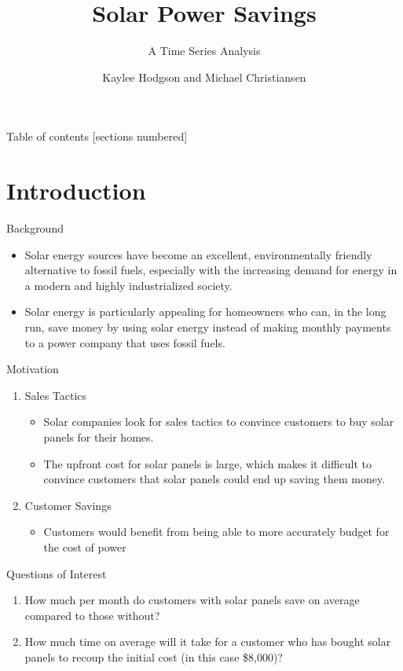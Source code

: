 \documentclass[10pt]{beamer}
\title{Solar Power Savings}
\subtitle{A Time Series Analysis}
\date{}
\author{Kaylee Hodgson and Michael Christiansen}
\institute{Brigham Young University}
\begin{document}
\maketitle

\begin{frame}{Table of contents}
  [sections numbered]
  \tableofcontents[hideallsubsections]
\end{frame}

\section{Introduction}

\begin{frame}[fragile]{Background}
\begin{itemize}
\item Solar energy sources have become an excellent, environmentally friendly alternative to fossil fuels, especially with the increasing demand for energy in a modern and highly industrialized society.
\item Solar energy is particularly appealing for homeowners who can, in the long run, save money by using solar energy instead of making monthly payments to a power company that uses fossil fuels.
\end{itemize}
\end{frame}

\begin{frame}{Motivation}
\begin{enumerate}
\item Sales Tactics
\begin{itemize}
\item Solar companies look for sales tactics to convince customers to buy solar panels for their homes.
\item The upfront cost for solar panels is large, which makes it difficult to convince customers that solar panels could end up saving them money. 
\end{itemize}
\item Customer Savings
\begin{itemize}
\item Customers would benefit from being able to more accurately budget for the cost of power
\end{itemize}
\end{enumerate}
\end{frame}

\begin{frame}[fragile]{Questions of Interest}
\begin{enumerate}
\item How much per month do customers with solar panels save on average compared to those without?
\item How much time on average will it take for a customer who has bought solar panels to recoup the initial cost (in this case \$8,000)?
\end{enumerate}
\end{frame}
\end{document}
